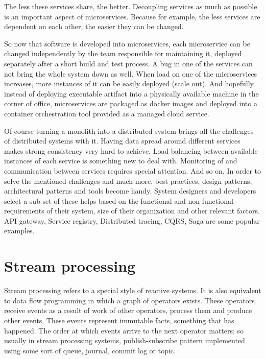 \documentclass[a4]{report}
\begin{document}
    The less these services share, the better.
    Decoupling services as much as possible is an important aspect of microservices.
    Because for example, the less services are dependent on each other, the easier they can be changed.

    So now that software is developed into microservices, each microservice can be changed independently by the
    team responsible for maintaining it, deployed separately after a short build and test process.
    A bug in one of the services can not bring the whole system down as well.
    When load on one of the microservices increases, more instances of it can be easily deployed (scale out).
    And hopefully instead of deploying executable artifact into a physically available machine in the corner of
    office, microservices are packaged as docker images and deployed into a container orchestration tool provided as
    a managed cloud service.

    Of course turning a monolith into a distributed system brings all the challenges of distributed systems with it.
    Having data spread around different services makes strong consistency very hard to achieve.
    Load balancing between available instances of each service is something new to deal with.
    Monitoring of and communication between services requires special attention.
    And so on.
    In order to solve the mentioned challenges and much more, best practices, design patterns, architectural patterns
    and tools become handy.
    System designers and developers select a sub set of these helps based on the functional and non-functional
    requirements of their system, size of their organization and other relevant factors.
    API gateway, Service registry, Distributed tracing, CQRS, Saga are some popular examples.
    \cite{microservice-architecture} \cite{microservices-pitfalls} \cite{microservices}


    \section{Stream processing}
    Stream processing refers to a special style of reactive systems.
    It is also equivalent to data flow programming in which a graph of operators exists.
    These operators receive events as a result of work of other operators, process them and produce other events.
    These events represent immutable facts, something that has happened.
    The order at which events arrive to the next operator matters;
    so usually in stream processing systems, publish-subscribe pattern implemented using some sort of queue,
    journal, commit log or topic.
    \cite{flink} \cite{fast-data-archs}
\end{document}
